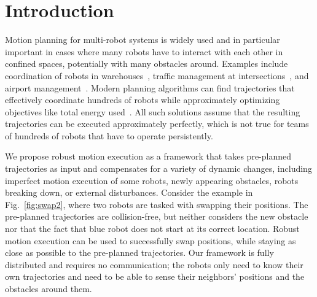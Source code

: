 \documentclass{svproc}
\begin{document}
\section{Introduction}
Motion planning for multi-robot systems is widely used and in particular important in cases where many robots have to interact with each other in confined spaces, potentially with many obstacles around.
Examples include coordination of robots in warehouses~\cite{Kiva}, traffic management at intersections~\cite{IntersectionManagementDresner}, and airport management~\cite{AirportTug}.
Modern planning algorithms can find trajectories that effectively coordinate hundreds of robots while approximately optimizing objectives like total energy used~\cite{crazyplanning-ieeetro}.
All such solutions assume that the resulting trajectories can be executed approximately perfectly, which is not true for teams of hundreds of robots that have to operate persistently.

We propose robust motion execution as a framework that takes pre-planned trajectories as input and compensates for a variety of dynamic changes, including imperfect motion execution of some robots, newly appearing obstacles, robots breaking down, or external disturbances.
Consider the example in Fig.~\ref{fig:swap2}, where two robots are tasked with swapping their positions.
The pre-planned trajectories are collision-free, but neither considers the new obstacle nor that the fact that blue robot does not start at its correct location.
Robust motion execution can be used to successfully swap positions, while staying as close as possible to the pre-planned trajectories.
Our framework is fully distributed and requires no communication; the robots only need to know their own trajectories and need to be able to sense their neighbors' positions and the obstacles around them.
\end{document}
